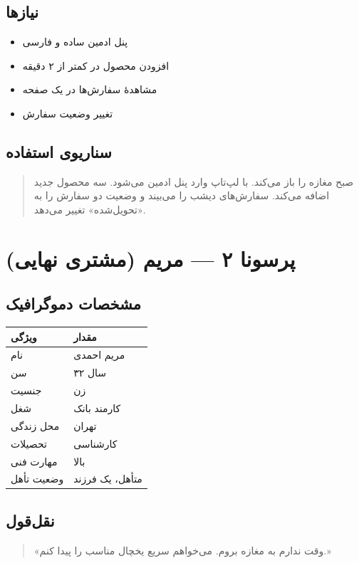 \documentclass[12pt, a4paper]{article}
\begin{document}
\subsection{نیازها}
\begin{itemize}
    \item پنل ادمین ساده و فارسی
    \item افزودن محصول در کمتر از ۲ دقیقه
    \item مشاهدهٔ سفارش‌ها در یک صفحه
    \item تغییر وضعیت سفارش
\end{itemize}

\subsection{سناریوی استفاده}
\begin{quote}
صبح مغازه را باز می‌کند. با لپ‌تاپ وارد پنل ادمین می‌شود.
سه محصول جدید اضافه می‌کند. سفارش‌های دیشب را می‌بیند
و وضعیت دو سفارش را به «تحویل‌شده» تغییر می‌دهد.
\end{quote}

\section{پرسونا ۲ — مریم (مشتری نهایی)}

\subsection{مشخصات دموگرافیک}
\begin{center}
\begin{tabular}{|l|l|}
\hline
\textbf{ویژگی} & \textbf{مقدار} \\
\hline
نام & مریم احمدی \\
\hline
سن & ۳۲ سال \\
\hline
جنسیت & زن \\
\hline
شغل & کارمند بانک \\
\hline
محل زندگی & تهران \\
\hline
تحصیلات & کارشناسی \\
\hline
مهارت فنی & بالا \\
\hline
وضعیت تأهل & متأهل، یک فرزند \\
\hline
\end{tabular}
\end{center}

\subsection{نقل‌قول}
\begin{quote}
«وقت ندارم به مغازه بروم. می‌خواهم سریع یخچال مناسب را پیدا کنم.»
\end{quote}
\end{document}
